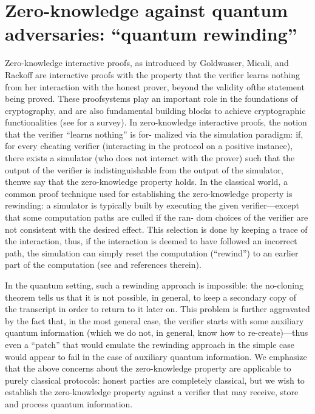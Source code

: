 \section{Zero-knowledge against quantum adversaries: “quantum rewinding”}
Zero-knowledge interactive proofs, as introduced by Goldwasser, Micali, and Rackoff  are interactive proofs with the property that the verifier learns nothing from her interaction with the honest prover, beyond the validity ofthe statement being proved. These proofsystems play an important role in the foundations of cryptography, and are also fundamental building blocks to achieve cryptographic functionalities (see \cite{Goldreich1991} for a survey). In zero-knowledge interactive proofs, the notion that the verifier “learns nothing” is for-
malized via the simulation paradigm: if, for every cheating verifier (interacting in the protocol on a positive instance), there exists a simulator (who does not interact with the prover) such that the output of the verifier is indistinguishable from the output of the simulator, thenwe say that the zero-knowledge property holds. In the classical world, a common proof technique used for establishing the zero-knowledge property is rewinding: a simulator is typically built by executing the given verifier—except that some computation paths are culled if the ran- dom choices of the verifier are not consistent with the desired effect. This selection is done by keeping a trace of the interaction, thus, if the interaction is deemed to have followed an incorrect path, the simulation can simply reset the computation (“rewind”) to an earlier part of the computation (see \cite{Goldreich1991} and references therein).

In the quantum setting, such a rewinding approach is impossible: the no-cloning theorem
tells us that it is not possible, in general, to keep a secondary copy of the transcript in order to return to it later on. This problem is further aggravated by the fact that, in the most general case, the verifier starts with some auxiliary quantum information (which we do not, in general, know how to re-create)—thus even a “patch” that would emulate the rewinding approach in the simple case would appear to fail in the case of auxiliary quantum information. We emphasize that the above concerns about the zero-knowledge property are applicable to purely classical protocols: honest parties are completely classical, but we wish to establish the zero-knowledge property against a verifier that may receive, store and process quantum information.